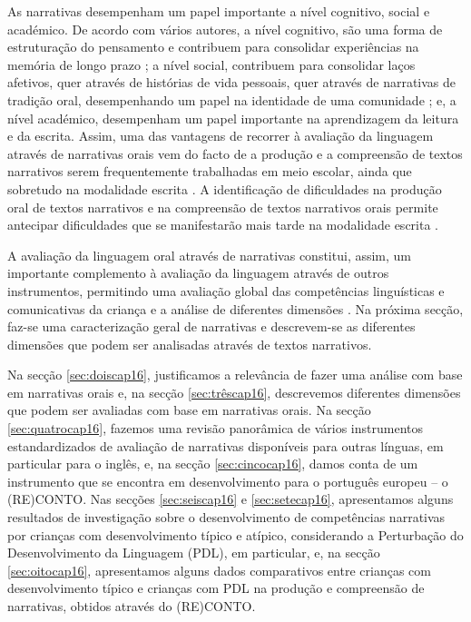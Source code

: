 \documentclass[output=paper,colorlinks,citecolor=brown,booklanguage=portuguese]{langscibook}
\begin{document}
As narrativas desempenham um papel importante a nível cognitivo, social e académico. De acordo com vários autores, a nível cognitivo, são uma forma de estruturação do pensamento e contribuem para consolidar experiências na memória de longo prazo \citep{Wang2015, Leon2016}; a nível social, contribuem para consolidar laços afetivos, quer através de histórias de vida pessoais, quer através de narrativas de tradição oral, desempenhando um papel na identidade de uma comunidade \citep{Labov2010}; e, a nível académico, desempenham um papel importante na aprendizagem da leitura e da escrita. Assim, uma das vantagens de recorrer à avaliação da linguagem através de narrativas orais vem do facto de a produção e a compreensão de textos narrativos serem frequentemente trabalhadas em meio escolar, ainda que sobretudo na modalidade escrita \citep{Pereira2005}. A identificação de dificuldades na produção oral de textos narrativos e na compreensão de textos narrativos orais permite antecipar dificuldades que se manifestarão mais tarde na modalidade escrita \citep{Dickinson2009, Villiers2010, Klop2011}.

A avaliação da linguagem oral através de narrativas constitui, assim, um importante complemento à avaliação da linguagem através de outros instrumentos, permitindo uma avaliação global das competências linguísticas e comunicativas da criança e a análise de diferentes dimensões \citep{Goncalves2011a}. Na próxima secção, faz-se uma caracterização geral de narrativas e descrevem-se as diferentes dimensões que podem ser analisadas através de textos narrativos.

Na secção \ref{sec:doiscap16}, justificamos a relevância de fazer uma análise com base em narrativas orais e, na secção \ref{sec:trêscap16}, descrevemos diferentes dimensões que podem ser avaliadas com base em narrativas orais. Na secção \ref{sec:quatrocap16}, fazemos uma revisão panorâmica de vários instrumentos estandardizados de avaliação de narrativas disponíveis para outras línguas, em particular para o inglês, e, na secção \ref{sec:cincocap16}, damos conta de um instrumento que se encontra em desenvolvimento para o português europeu – o (RE)CONTO. Nas secções \ref{sec:seiscap16} e \ref{sec:setecap16}, apresentamos alguns resultados de investigação sobre o desenvolvimento de competências narrativas por crianças com desenvolvimento típico e atípico, considerando a Perturbação do Desenvolvimento da Linguagem (PDL), em particular, e, na secção \ref{sec:oitocap16}, apresentamos alguns dados comparativos entre crianças com desenvolvimento típico e crianças com PDL na produção e compreensão de narrativas, obtidos através do (RE)CONTO. 
\end{document}
